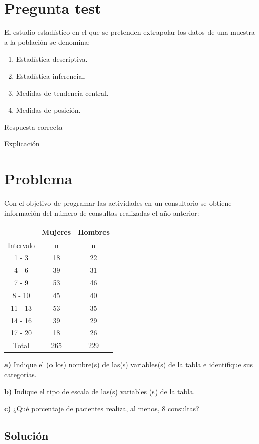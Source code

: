\documentclass[
]{book}
\providecommand{\tightlist}{%
  \setlength{\itemsep}{0pt}\setlength{\parskip}{0pt}}
\begin{document}
\hypertarget{pregunta-test-12}{%
\section{Pregunta test}\label{pregunta-test-12}}

El estudio estadístico en el que se pretenden extrapolar los datos de una muestra a la población se denomina:

\begin{enumerate}
\def\labelenumi{\alph{enumi})}
\tightlist
\item
  Estadística descriptiva.
\item
  Estadística inferencial.
\item
  Medidas de tendencia central.
\item
  Medidas de posición.
\end{enumerate}

Respuesta correcta

\href{https://1fjmanzano.github.io/bioestadistica/inferencia-estad\%C3\%ADstica.html}{Explicación}

\hypertarget{problema-2}{%
\section{Problema}\label{problema-2}}

Con el objetivo de programar las actividades en un consultorio se obtiene información del número de consultas realizadas el año anterior:

\begin{longtable}[]{@{}ccc@{}}
\toprule
& Mujeres & Hombres\tabularnewline
\midrule
\endhead
Intervalo & n & n\tabularnewline
1 - 3 & 18 & 22\tabularnewline
4 - 6 & 39 & 31\tabularnewline
7 - 9 & 53 & 46\tabularnewline
8 - 10 & 45 & 40\tabularnewline
11 - 13 & 53 & 35\tabularnewline
14 - 16 & 39 & 29\tabularnewline
17 - 20 & 18 & 26\tabularnewline
Total & 265 & 229\tabularnewline
\bottomrule
\end{longtable}

\textbf{a)} Indique el (o los) nombre(s) de las(s) variables(s) de la tabla e identifique sus categorías.

\textbf{b)} Indique el tipo de escala de las(s) variables (s) de la tabla.

\textbf{c)} ¿Qué porcentaje de pacientes realiza, al menos, 8 consultas?

\hypertarget{soluciuxf3n-2}{%
\subsection{Solución}\label{soluciuxf3n-2}}
\end{document}
